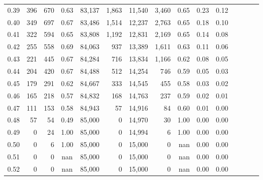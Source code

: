 \begin{tabular}{rrrcrrrrrrrrrrr}
0.39 &    396 &  670 &                                       0.63 &  83,137 &   1,863 &  11,540 &   3,460 &  0.65 &  0.23 &                         0.12 \\
0.40 &    349 &  697 &                                       0.67 &  83,486 &   1,514 &  12,237 &   2,763 &  0.65 &  0.18 &                         0.10 \\
0.41 &    322 &  594 &                                       0.65 &  83,808 &   1,192 &  12,831 &   2,169 &  0.65 &  0.14 &                         0.08 \\
0.42 &    255 &  558 &                                       0.69 &  84,063 &     937 &  13,389 &   1,611 &  0.63 &  0.11 &                         0.06 \\
0.43 &    221 &  445 &                                       0.67 &  84,284 &     716 &  13,834 &   1,166 &  0.62 &  0.08 &                         0.05 \\
0.44 &    204 &  420 &                                       0.67 &  84,488 &     512 &  14,254 &     746 &  0.59 &  0.05 &                         0.03 \\
0.45 &    179 &  291 &                                       0.62 &  84,667 &     333 &  14,545 &     455 &  0.58 &  0.03 &                         0.02 \\
0.46 &    165 &  218 &                                       0.57 &  84,832 &     168 &  14,763 &     237 &  0.59 &  0.02 &                         0.01 \\
0.47 &    111 &  153 &                                       0.58 &  84,943 &      57 &  14,916 &      84 &  0.60 &  0.01 &                         0.00 \\
0.48 &     57 &   54 &                                       0.49 &  85,000 &       0 &  14,970 &      30 &  1.00 &  0.00 &                         0.00 \\
0.49 &      0 &   24 &                                       1.00 &  85,000 &       0 &  14,994 &       6 &  1.00 &  0.00 &                         0.00 \\
0.50 &      0 &    6 &                                       1.00 &  85,000 &       0 &  15,000 &       0 &   nan &  0.00 &                         0.00 \\
0.51 &      0 &    0 &                                        nan &  85,000 &       0 &  15,000 &       0 &   nan &  0.00 &                         0.00 \\
0.52 &      0 &    0 &                                        nan &  85,000 &       0 &  15,000 &       0 &   nan &  0.00 &                         0.00 \\

\end{tabular}
